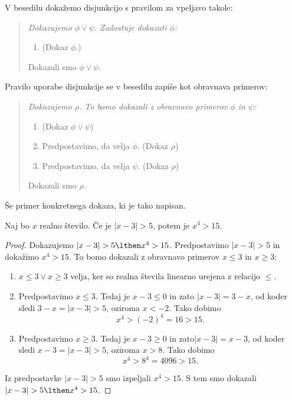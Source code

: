 V besedilu dokažemo disjunkcijo s pravilom za vpeljavo takole:
%
\begin{quote}
  \it
  Dokazujemo $\phi \lor \psi$. Zadostuje dokazati $\phi$:
  \begin{enumerate}
  \item[] (Dokaz $\phi$.)
  \end{enumerate}
  Dokazali smo $\phi \lor \psi$.
\end{quote}
%
Pravilo uporabe disjunkcije se v besedilu zapiše kot obravnava
primerov:
%
\begin{quote}
  \it
  Dokazujemo $\rho$. To bomo dokazali z obravnavo primerov $\phi$ in
  $\psi$:
  \begin{enumerate}
  \item (Dokaz $\phi \lor \psi$)
  \item Predpostavimo, da velja $\phi$. (Dokaz $\rho$)
  \item Predpostavimo, da velja $\psi$. (Dokaz $\rho$)
  \end{enumerate}
  Dokazali smo $\rho$.
\end{quote}
%
Še primer konkretnega dokaza, ki je tako napisan.

\begin{izrek}
  \label{izrek:x-3-5}
  Naj bo $x$ realno število. Če je $|x - 3| > 5$, potem je $x^4 > 15$.
\end{izrek}

\begin{proof}
  Dokazujemo $|x - 3| > 5 \lthen x^4 > 15$. Predpostavimo $|x - 3| > 5$
  in dokažimo $x^4 > 15$. To bomo dokazali z obravnavo primerov $x \leq
  3$ in $x \geq 3$:
  \begin{enumerate}
  \item $x \leq 3 \lor x \geq 3$ velja, ker so realna števila linearno
    urejena z relacijo $\leq$.
  \item Predpostavimo $x \leq 3$. Tedaj je $x - 3 \leq 0$ in zato $|x
    - 3| = 3 - x$, od koder sledi $3 - x = |x - 3| > 5$, oziroma $x <
    -2$. Tako dobimo
    \begin{equation*}
      x^4 > (-2)^4 = 16 > 15.
    \end{equation*}
  \item Predpostavimo $x \geq 3$. Tedaj je $x - 3 \geq 0$ in zato$|x -
    3| = x - 3$, od koder sledi $x - 3 = |x - 3| > 5$, oziroma $x >
    8$. Tako dobimo
    \begin{equation*}
      x^4 > 8^4 = 4096 > 15.
    \end{equation*}
  \end{enumerate}
  Iz predpostavke $|x - 3| > 5$ smo izpeljali $x^4 > 15$. S tem smo
  dokazali $|x - 3| > 5 \lthen x^4 > 15$.
\end{proof}

